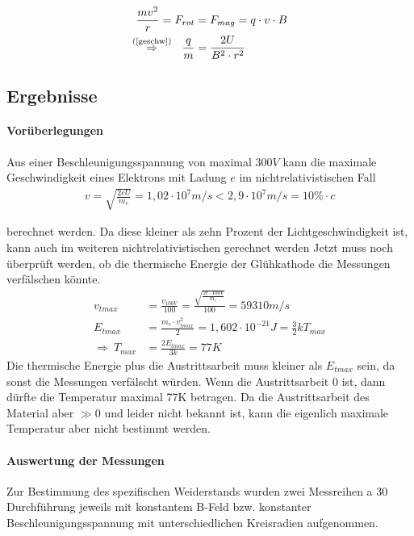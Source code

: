 \documentclass[11pt, a4paper]{article}
\begin{document}
    \begin{align}
        \frac{mv^2}{r} = F_{rot} &= F_{mag} = q \cdot v \cdot B \\
        \overset{\text{(\ref{geschw})}}{\Rightarrow} \ \  \frac{q}{m} &= \frac{2U}{B^2 \cdot r^2} \label{qm_formel}
    \end{align}

    \subsection{Ergebnisse}
    \paragraph{Vorüberlegungen}

    Aus einer Beschleunigungsspannung von maximal $300 \si{V}$ kann die maximale Geschwindigkeit eines Elektrons mit Ladung $e$ im nichtrelativistischen Fall
    \begin{align}
        v = \sqrt{\frac{2 e U}{m_e}} = 1,02 \cdot 10^{7} \si{m/s} < 2,9 \cdot 10^{7} \si{m/s} = 10\% \cdot c
    \end{align}


    berechnet werden. Da diese kleiner als zehn Prozent der Lichtgeschwindigkeit ist, kann auch im weiteren nichtrelativistischen gerechnet werden
    Jetzt muss noch überprüft werden, ob die thermische Energie der Glühkathode die Messungen verfälschen könnte.
    \begin{align}
        v_{tmax} &= \frac{v_{100V}}{100} = \frac{\sqrt{\frac{2 e \cdot 100 \si{V}}{m_e}}}{100} = 59310 \si{m \per s} \\
        E_{tmax} &= \frac{m_e \cdot v_{tmax}^2}{2} = 1,602 \cdot 10^{-21} \si{J} = \frac{3}{2} k T_{max} \\
        \Rightarrow \ T_{max} &= \frac{2 E_{tmax}}{3 k} = 77K
    \end{align}
    Die thermische Energie plus die Austrittsarbeit muss kleiner als $E_{tmax}$ sein, da sonst die Messungen verfälscht würden. Wenn die Austrittsarbeit $0$ ist, dann dürfte die Temperatur maximal 77K betragen. Da die Austrittsarbeit des Material aber $\gg0$ und leider nicht bekannt ist, kann die eigenlich maximale Temperatur aber nicht bestimmt werden.


    \paragraph{Auswertung der Messungen}
        Zur Bestimmung des spezifischen Weiderstands wurden zwei Messreihen a 30 Durchführung jeweils mit konstantem B-Feld bzw. konstanter Beschleunigungsspannung mit unterschiedlichen Kreisradien aufgenommen.
        
\end{document}
